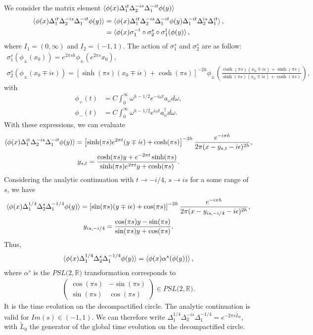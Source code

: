 \documentclass[a4paper,11pt]{article}
\theoremstyle{definition}
\begin{document}
We consider the matrix element $\braket{\phi(x)\Delta_1^{it}\Delta_2^{-is}\Delta_1^{-it}\phi(y)}$
\begin{align}
    \braket{\phi(x)\Delta_1^{it}\Delta_2^{-is}\Delta_1^{-it}\phi(y)} &= \braket{\phi(x)\Delta_1^{it}\Delta_2^{-is}\Delta_1^{-it}\phi(y)\Delta_1^{-it}\Delta_2^{is}\Delta_1^{it}},\\
    &= \braket{\phi(x) \sigma_1^{-t} \circ \sigma_2^s\circ\sigma_1^t(\phi(y)},
\end{align}
where $I_1 = (0,\infty)$ and $I_2 = (-1,1)$. The action of $\sigma_1^s$ and $\sigma_2^s$ are as follow:
\begin{gather}
    \sigma_1^s(\phi_\pm(x_0)) = e^{2\pi sh} \phi_\pm(e^{2\pi s}x_0), \\
    \sigma_2^s(\phi_\pm(x_0\mp i\epsilon)) = \left[\sinh(\pi s)(x_0\mp i\epsilon)+\cosh(\pi s)\right]^{-2h} \phi_\pm\left(\frac{\cosh(\pi s)(x_0\mp i\epsilon)+\sinh(\pi s)}{\sinh(\pi s) (x_0\mp i\epsilon) + \cosh(\pi s)}\right),    
\end{gather}
with 
\begin{align}
    \phi_+(t) &= C\int_0^\infty \omega^{h-1/2} e^{-i\omega t}a_\omega  d\omega,\\
    \phi_-(t) &= C\int_0^\infty \omega^{h-1/2} e^{i\omega t}a_\omega^\dagger d\omega.
\end{align}
With these expressions, we can evaluate 
\begin{gather}
    \braket{\phi(x)\Delta_1^{it}\Delta_2^{-is}\Delta_1^{-it}\phi(y)} = \left[\sinh(\pi s)e^{2\pi t}(y\mp i\epsilon)+\cosh(\pi s)\right]^{-2h} \frac{e^{-i\pi h}}{2\pi(x-y_{s,t}-i\epsilon)^{2h}},\\
    y_{s,t} = \frac{\cosh(\pi s)y+e^{-2\pi t}\sinh(\pi s)}{\sinh(\pi s) e^{2\pi t}y + \cosh(\pi s)}.
\end{gather}
Considering the analytic continuation with $t\to -i/4$, $s\to is$ for a some range of $s$, we have
\begin{gather}
    \braket{\phi(x)\Delta_1^{1/4}\Delta_2^{s}\Delta_1^{-1/4}\phi(y)} = \left[\sin(\pi s)(y\mp i\epsilon)+\cos(\pi s)\right]^{-2h} \frac{e^{-i\pi h}}{2\pi(x-y_{is,-i/4}-i\epsilon)^{2h}},\\
    y_{is,-i/4} = \frac{\cos(\pi s) y-\sin(\pi s)}{\sin(\pi s)y + \cos(\pi s)}.
\end{gather}
Thus,
\begin{gather}
    \braket{\phi(x)\Delta_1^{1/4}\Delta_2^{s}\Delta_1^{-1/4}\phi(y)} = \braket{\phi(x) \alpha^s(\phi(y))},
\end{gather}
where $\alpha^s$ is the $PSL(2,\mathbb{R)}$ transformation corresponds to  
\begin{align}
\begin{pmatrix}
    \cos(\pi s) &-\sin(\pi s) \\
    \sin(\pi s) & \cos(\pi s)
\end{pmatrix} \in PSL(2,\mathbb{R)}.
\end{align}
It is the time evolution on the decompactified circle. The analytic continuation is valid for $Im(s) \in(-1,1)$. We can therefore write $\Delta_1^{1/4}\Delta_2^{-is}\Delta_1^{-1/4} = e^{-2\pi s \tilde{L}_0}$, with $\tilde{L}_0$ the generator of the global time evolution on the decompactified circle.
\end{document}
